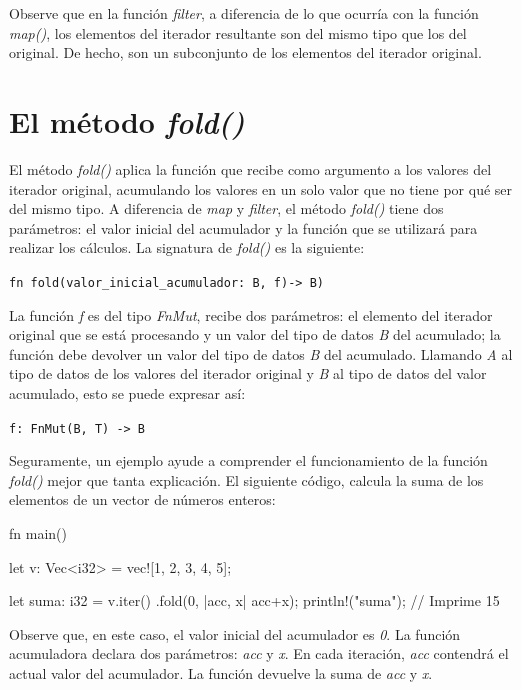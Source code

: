 Observe que en la función \textit{filter}, a diferencia de lo que ocurría con la función \textit{map()}, los elementos del iterador resultante son del mismo tipo que los del original. De hecho, son un subconjunto de los elementos del iterador original.

\section{El método \textit{fold()}}
\noindent El método \textit{fold()} aplica la función que recibe como argumento a los valores del iterador original, acumulando los valores en un solo valor que no tiene por qué ser del mismo tipo. A diferencia de \textit{map} y \textit{filter}, el método \textit{fold()} tiene dos parámetros: el valor inicial del acumulador y la función que se utilizará para realizar los cálculos. La signatura de \textit{fold()} es la siguiente:

{\centering \texttt{fn fold(valor\_inicial\_acumulador: B, f)-> B)} \par}

La función \textit{f} es del tipo \textit{FnMut}, recibe dos parámetros: el elemento del iterador original que se está procesando y un valor del tipo de datos \textit{B} del acumulado; la función debe devolver un valor del tipo de datos \textit{B} del acumulado. Llamando \textit{A} al tipo de datos de los valores del iterador original y \textit{B} al tipo de datos del valor acumulado, esto se puede expresar así:

{\centering \texttt{f: FnMut(B, T) -> B} \par}

Seguramente, un ejemplo ayude a comprender el funcionamiento de la función \textit{fold()} mejor que tanta explicación. El siguiente código, calcula la suma de los elementos de un vector de números enteros:

\vspace{0.7em}
\begin{Codigo}
   fn main() {
      let v: Vec<i32> = vec![1, 2, 3, 4, 5];
      
      let suma: i32 = v.iter()
      .fold(0, |acc, x| acc+x);
      println!("{suma}"); // Imprime 15
   }
\end{Codigo}

Observe que, en este caso, el valor inicial del acumulador es \textit{0}. La función acumuladora declara dos parámetros: \textit{acc} y \textit{x}. En cada iteración, \textit{acc} contendrá el actual valor del acumulador. La función devuelve la suma de \textit{acc} y \textit{x}. 

